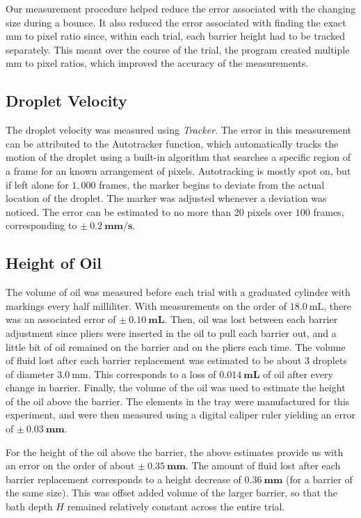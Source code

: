 Our measurement procedure helped reduce the error associated with the changing size during a bounce. It also reduced the error associated with finding the exact mm to pixel ratio since, within each trial, each barrier height had to be tracked separately. This meant over the course of the trial, the program created multiple mm to pixel ratios, which improved the accuracy of the measurements.

    \subsection{Droplet Velocity}
The droplet velocity was measured using \textit{Tracker}. The error in this measurement can be attributed to the Autotracker function, which automatically tracks the motion of the droplet using a built-in algorithm that searches a specific region of a frame for an known arrangement of pixels. Autotracking is mostly spot on, but if left alone for $1,000$ frames, the marker begins to deviate from the actual location of the droplet. The marker was adjusted whenever a deviation was noticed. The error can be estimated to no more than 20 pixels over $100$ frames, corresponding to $\mathbf{\pm~0.2~\mathrm{\textbf{mm/s}}}$.

    \subsection{Height of Oil}
The volume of oil was measured before each trial with a graduated cylinder with markings every half milliliter. With measurements on the order of $18.0~\mathrm{mL}$, there was an associated error of $\mathbf{\pm~0.10~\mathrm{\textbf{mL}}}$. Then, oil was lost between each barrier adjustment since pliers were inserted in the oil to pull each barrier out, and a little bit of oil remained on the barrier and on the pliers each time. The volume of fluid lost after each barrier replacement was estimated to be about 3 droplets of diameter $3.0~\mathrm{mm}$. This corresponds to a loss of $\mathbf{0.014~\mathrm{\textbf{mL}}}$ of oil after every change in barrier. Finally, the volume of the oil was used to estimate the height of the oil above the barrier. The elements in the tray were manufactured for this experiment, and were then measured using a digital caliper ruler yielding an error of $\mathbf{\pm~0.03~\mathrm{\textbf{mm}}}$. 

For the height of the oil above the barrier, the above estimates provide us with an error on the order of about $\mathbf{\pm~0.35~\mathrm{\textbf{mm}}}$. The amount of fluid lost after each barrier replacement corresponds to a height decrease of $\mathbf{0.36~\mathrm{\textbf{mm}}}$ (for a barrier of the same size). This was offset added volume of the larger barrier, so that the bath depth $H$ remained relatively constant across the entire trial. 

